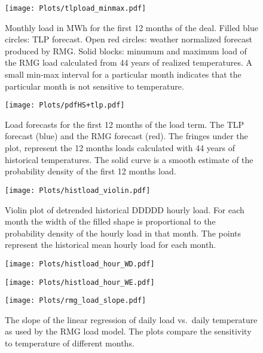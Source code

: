 \documentclass[letterpaper,12pt]{article}
\newcommand{\dealname}{DDDDD }
\begin{document}
\begin{figure}
  \texttt{[image: Plots/tlpload\_minmax.pdf]}
  \caption{Monthly load in MWh for the first 12 months of the deal.
  Filled blue circles: TLP forecast. Open red circles: weather
  normalized forecast produced by RMG. Solid blocks: minumum and
  maximum load of the RMG load calculated from 44 years of realized
  temperatures.  A small min-max interval for a particular month
  indicates that the particular month is not sensitive to
  temperature. \label{Fig:tlpload_minmax}}
\end{figure}
\begin{figure}
  \texttt{[image: Plots/pdfHS+tlp.pdf]}
  \caption{Load forecasts for the first 12 months of the load term.
  The TLP forecast (blue) and the RMG forecast (red).  The fringes
  under the plot, represent the 12 months loads calculated with 44
  years of historical temperatures.  The solid curve is a smooth
  estimate of the probability density of the first 12 months load.}
\end{figure}
\begin{figure}
  \texttt{[image: Plots/histload\_violin.pdf]}
  \caption{Violin plot of detrended historical \dealname hourly load.
  For each month the width of the filled shape is proportional to the
  probability density of the hourly load in that month.  The points
  represent the historical mean hourly load for each month. }
\end{figure}
\begin{figure}
  \texttt{[image: Plots/histload\_hour\_WD.pdf]}
\end{figure}
\begin{figure}
  \texttt{[image: Plots/histload\_hour\_WE.pdf]}
\end{figure}
\begin{figure}
  \texttt{[image: Plots/rmg\_load\_slope.pdf]}
  \caption{The slope of the linear regression of daily load vs.\ daily
   temperature as used by the RMG load model.  The plots compare the
   sensitivity to temperature of different months.}
\end{figure}
\end{document}
